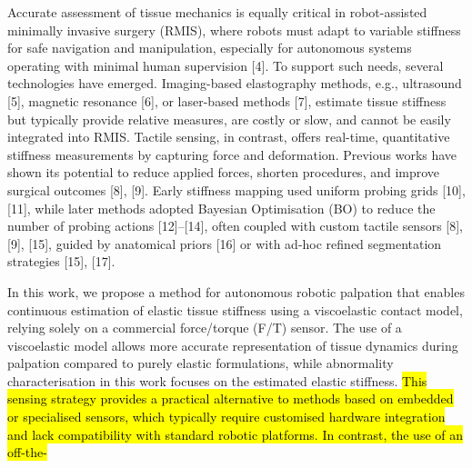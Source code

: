 \documentclass[11pt]{article}
\begin{document}
Accurate assessment of tissue mechanics is equally critical in
robot-assisted minimally invasive surgery (RMIS), where robots must
adapt to variable stiffness for safe navigation and manipulation,
especially for autonomous systems operating with minimal human
supervision [4]. To support such needs, several technologies have
emerged. Imaging-based elastography methods, e.g., ultrasound [5],
magnetic resonance [6], or laser-based methods [7], estimate tissue
stiffness but typically provide relative measures, are costly or slow,
and cannot be easily integrated into RMIS. Tactile sensing, in
contrast, offers real-time, quantitative stiffness measurements by
capturing force and deformation. Previous works have shown its
potential to reduce applied forces, shorten procedures, and improve
surgical outcomes [8], [9]. Early stiffness mapping used uniform
probing grids [10], [11], while later methods adopted Bayesian
Optimisation (BO) to reduce the number of probing actions [12]--[14],
often coupled with custom tactile sensors [8], [9], [15], guided by
anatomical priors [16] or with ad-hoc refined segmentation strategies
[15], [17].

In this work, we propose a method for autonomous robotic palpation
that enables continuous estimation of elastic tissue stiffness using
a viscoelastic contact model, relying solely on a commercial
force/torque (F/T) sensor. The use of a viscoelastic model allows
more accurate representation of tissue dynamics during palpation
compared to purely elastic formulations, while abnormality
characterisation in this work focuses on the estimated elastic
stiffness. \hl{This sensing strategy provides a practical alternative to
methods based on embedded or specialised sensors, which typically
require customised hardware integration and lack compatibility with
standard robotic platforms. In contrast, the use of an off-the-}
\end{document}
